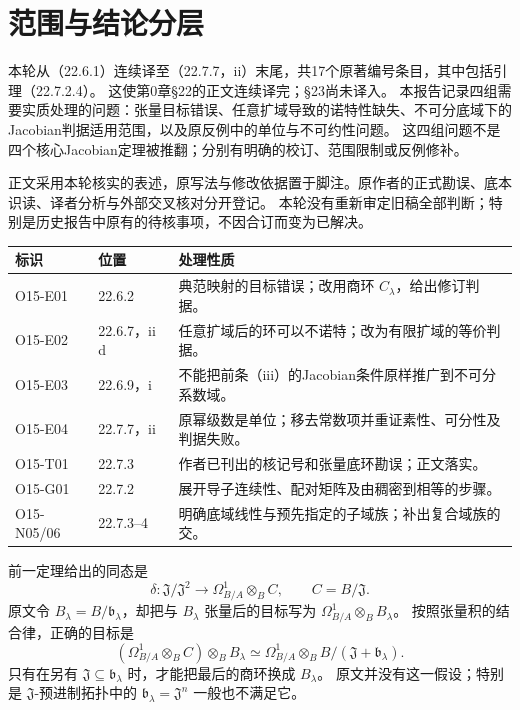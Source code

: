 
\section*{范围与结论分层}
本轮从（22.6.1）连续译至（22.7.7，ii）末尾，共17个原著编号条目，其中包括引理（22.7.2.4）。
这使第0章§22的正文连续译完；§23尚未译入。
本报告记录四组需要实质处理的问题：张量目标错误、任意扩域导致的诺特性缺失、不可分底域下的Jacobian判据适用范围，以及原反例中的单位与不可约性问题。
这四组问题不是四个核心Jacobian定理被推翻；分别有明确的校订、范围限制或反例修补。

正文采用本轮核实的表述，原写法与修改依据置于脚注。原作者的正式勘误、底本识读、译者分析与外部交叉核对分开登记。
本轮没有重新审定旧稿全部判断；特别是历史报告中原有的待核事项，不因合订而变为已解决。

\begin{longtable}{@{}p{.18\linewidth}p{.20\linewidth}p{.52\linewidth}@{}}
\toprule 标识&位置&处理性质\\\midrule\endhead
O15-E01&22.6.2&典范映射的目标错误；改用商环 $C_\lambda$，给出修订判据。\\
O15-E02&22.6.7，ii d&任意扩域后的环可以不诺特；改为有限扩域的等价判据。\\
O15-E03&22.6.9，i&不能把前条（iii）的Jacobian条件原样推广到不可分系数域。\\
O15-E04&22.7.7，ii&原幂级数是单位；移去常数项并重证素性、可分性及判据失败。\\
O15-T01&22.7.3&作者已刊出的核记号和张量底环勘误；正文落实。\\
O15-G01&22.7.2&展开导子连续性、配对矩阵及由稠密到相等的步骤。\\
O15-N05/06&22.7.3--4&明确底域线性与预先指定的子域族；补出复合域族的交。\\
\bottomrule
\end{longtable}

前一定理给出的同态是
\[
 \delta:\mathfrak J/\mathfrak J^2\longrightarrow\Omega^1_{B/A}\otimes_BC,
 \qquad C=B/\mathfrak J.
\]
原文令 $B_\lambda=B/\mathfrak b_\lambda$，却把与 $B_\lambda$ 张量后的目标写为
$\Omega^1_{B/A}\otimes_BB_\lambda$。
按照张量积的结合律，正确的目标是
\[
 (\Omega^1_{B/A}\otimes_BC)\otimes_BB_\lambda
 \simeq\Omega^1_{B/A}\otimes_BB/(\mathfrak J+\mathfrak b_\lambda).
\]
只有在另有 $\mathfrak J\subseteq\mathfrak b_\lambda$ 时，才能把最后的商环换成 $B_\lambda$。
原文并没有这一假设；特别是 $\mathfrak J$-预进制拓扑中的 $\mathfrak b_\lambda=\mathfrak J^n$ 一般也不满足它。

